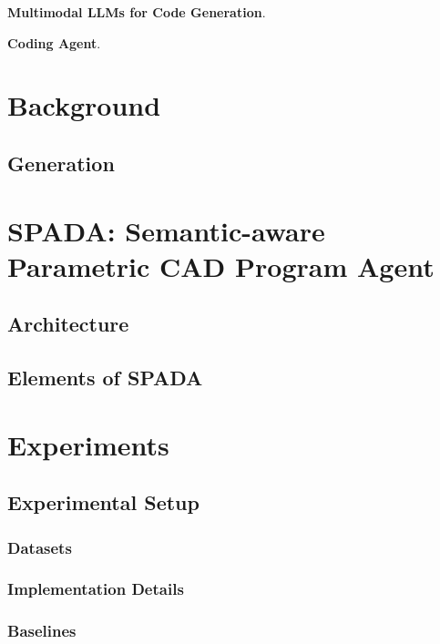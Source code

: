 \documentclass[doubleblind]{ecai}
\begin{document}
\textbf{Multimodal LLMs for Code Generation}.

\textbf{Coding Agent}.

\section{Background}

\subsection{Generation}


\section{SPADA: Semantic-aware Parametric CAD Program Agent}

\subsection{Architecture} %


\subsection{Elements of SPADA} %



\section{Experiments}

\subsection{Experimental Setup}

\subsubsection{Datasets}

\subsubsection{Implementation Details}

\subsubsection{Baselines}
\end{document}
